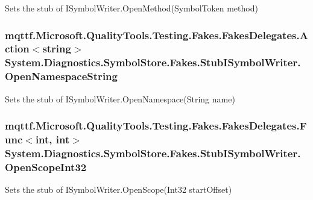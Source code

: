 Sets the stub of I\-Symbol\-Writer.\-Open\-Method(\-Symbol\-Token method)

\hypertarget{class_system_1_1_diagnostics_1_1_symbol_store_1_1_fakes_1_1_stub_i_symbol_writer_a026bdd07e4ed6804a5dc6d9ebf2347cb}{
\subsubsection[{Open\-Namespace\-String}]{\setlength{\rightskip}{0pt plus 5cm}mqttf.\-Microsoft.\-Quality\-Tools.\-Testing.\-Fakes.\-Fakes\-Delegates.\-Action$<$string$>$ System.\-Diagnostics.\-Symbol\-Store.\-Fakes.\-Stub\-I\-Symbol\-Writer.\-Open\-Namespace\-String}}\label{class_system_1_1_diagnostics_1_1_symbol_store_1_1_fakes_1_1_stub_i_symbol_writer_a026bdd07e4ed6804a5dc6d9ebf2347cb}


Sets the stub of I\-Symbol\-Writer.\-Open\-Namespace(\-String name)

\hypertarget{class_system_1_1_diagnostics_1_1_symbol_store_1_1_fakes_1_1_stub_i_symbol_writer_ae9c1e9026003773a9ae9d8b18674fab4}{
\subsubsection[{Open\-Scope\-Int32}]{\setlength{\rightskip}{0pt plus 5cm}mqttf.\-Microsoft.\-Quality\-Tools.\-Testing.\-Fakes.\-Fakes\-Delegates.\-Func$<$int, int$>$ System.\-Diagnostics.\-Symbol\-Store.\-Fakes.\-Stub\-I\-Symbol\-Writer.\-Open\-Scope\-Int32}}\label{class_system_1_1_diagnostics_1_1_symbol_store_1_1_fakes_1_1_stub_i_symbol_writer_ae9c1e9026003773a9ae9d8b18674fab4}


Sets the stub of I\-Symbol\-Writer.\-Open\-Scope(\-Int32 start\-Offset)

